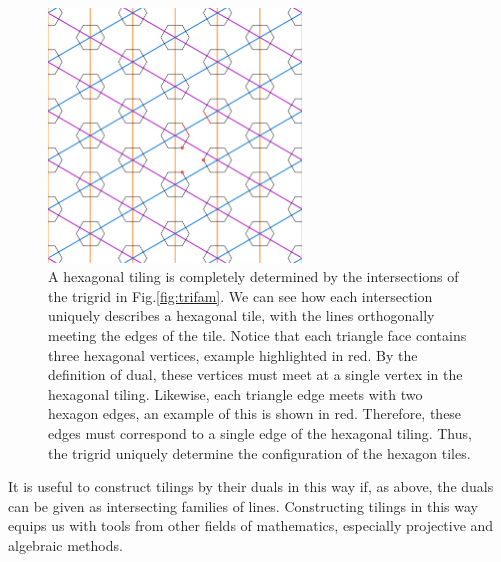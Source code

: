 \documentclass[
  oneside,
  11pt, a4paper,
  footinclude=true,
  headinclude=true,
  cleardoublepage=empty
]{scrbook}
\begin{document}
\begin{figure}[H]
\centering
\includegraphics[width=0.6\textwidth]{HexagonDualSmall}
\caption[Hexagons Defined by Trigrid Intersections]{A hexagonal tiling is completely determined by the intersections of the trigrid in Fig.\ref{fig:trifam}. We can see how each intersection uniquely describes a hexagonal tile, with the lines orthogonally meeting the edges of the tile. Notice that each triangle face contains three hexagonal vertices, example highlighted in red. By the definition of dual, these vertices must meet at a single vertex in the hexagonal tiling. Likewise, each triangle edge meets with two hexagon edges, an example of this is shown in red. Therefore, these edges must correspond to a single edge of the hexagonal tiling. Thus, the trigrid uniquely determine the configuration of the hexagon tiles.}
\label{fig:hexsmall}
\end{figure}

It is useful to construct tilings by their duals in this way if, as above, the duals can be given as intersecting families of lines. Constructing tilings in this way equips us with tools from other fields of mathematics, especially projective and algebraic methods.
\end{document}
